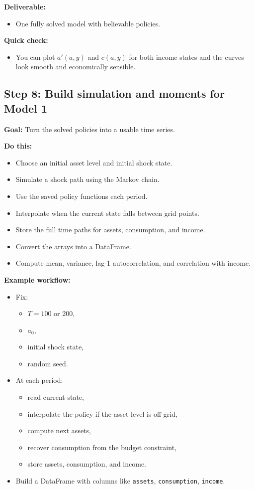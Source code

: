 \documentclass[11pt]{article}
\begin{document}
\textbf{Deliverable:}
\begin{itemize}
    \item One fully solved model with believable policies.
\end{itemize}

\textbf{Quick check:}
\begin{itemize}
    \item You can plot \(a'(a,y)\) and \(c(a,y)\) for both income states and the curves look smooth and economically sensible.
\end{itemize}

\subsection{Step 8: Build simulation and moments for Model 1}
\textbf{Goal:} Turn the solved policies into a usable time series.

\textbf{Do this:}
\begin{itemize}
    \item Choose an initial asset level and initial shock state.
    \item Simulate a shock path using the Markov chain.
    \item Use the saved policy functions each period.
    \item Interpolate when the current state falls between grid points.
    \item Store the full time paths for assets, consumption, and income.
    \item Convert the arrays into a DataFrame.
    \item Compute mean, variance, lag-1 autocorrelation, and correlation with income.
\end{itemize}

\textbf{Example workflow:}
\begin{itemize}
    \item Fix:
    \begin{itemize}
        \item \(T = 100\) or \(200\),
        \item \(a_0\),
        \item initial shock state,
        \item random seed.
    \end{itemize}
    \item At each period:
    \begin{itemize}
        \item read current state,
        \item interpolate the policy if the asset level is off-grid,
        \item compute next assets,
        \item recover consumption from the budget constraint,
        \item store assets, consumption, and income.
    \end{itemize}
    \item Build a DataFrame with columns like \verb|assets|, \verb|consumption|, \verb|income|.
\end{itemize}
\end{document}
